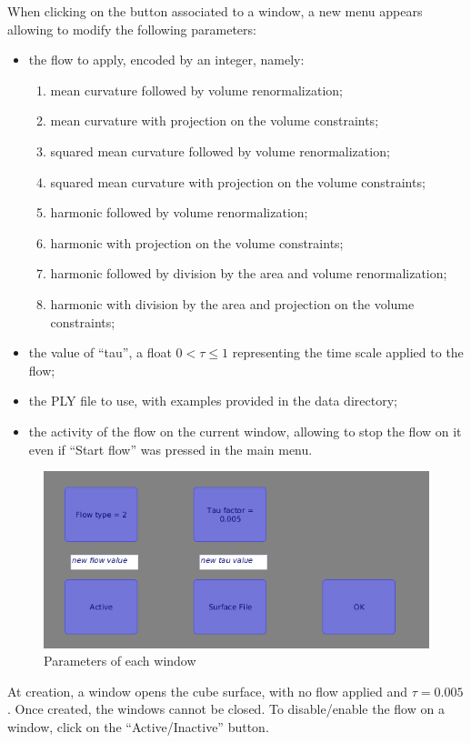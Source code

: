 \documentclass{article}
\begin{document}
When clicking on the button associated to a window, a new menu appears
allowing to modify the following parameters:
\begin{itemize}
  \item the flow to apply, encoded by an integer, namely:
  \begin{enumerate}
    \item mean curvature followed by volume renormalization;
    \item mean curvature with projection on the volume constraints;
    \item squared mean curvature followed by volume renormalization;
    \item squared mean curvature with projection on the volume constraints;
    \item harmonic followed by volume renormalization;
    \item harmonic with projection on the volume constraints;
    \item harmonic followed by division by the area and volume renormalization;
    \item harmonic with division by the area and projection on the volume constraints;
  \end{enumerate}
  \item the value of ``tau'', a float $0 < \tau \leq 1$ representing the time scale applied to the flow;
  \item the PLY file to use, with examples provided in the data directory;
  \item the activity of the flow on the current window,
    allowing to stop the flow on it even if ``Start flow'' was pressed in the main menu.
\end{itemize}

\begin{figure}[h]
  \begin{center}
    \includegraphics[width=.5\textwidth]{img/win_params.png}
    \caption{Parameters of each window}
    \label{fig:win_params}
  \end{center}
\end{figure}

At creation, a window opens the cube surface, with no flow applied and $\tau = 0.005$.
Once created, the windows cannot be closed. To disable/enable the flow on a window,
click on the ``Active/Inactive'' button.
\end{document}
